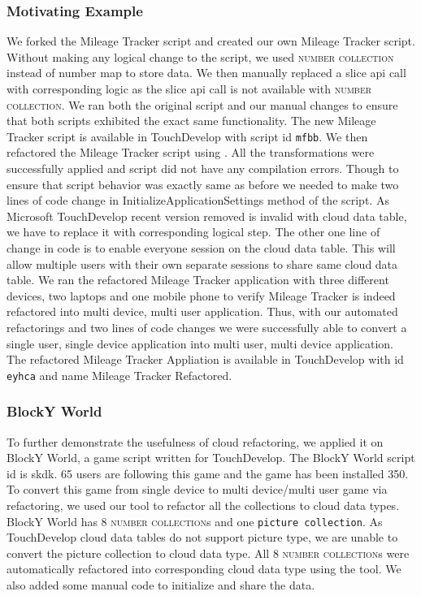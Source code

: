 \documentclass{sigplanconf}
\begin{document}
\subsubsection{Motivating Example}
We forked the Mileage Tracker script and created our own Mileage Tracker script. Without making any logical change to the script, we used \textsc{number collection} instead of number map to store data. We then manually replaced a slice api call with corresponding logic as the slice api call is not available with \textsc{number collection}. We ran both the original script and our manual changes to ensure that both scripts exhibited the exact same functionality. The new Mileage Tracker script is available in TouchDevelop with script id \texttt{mfbb}.  We then refactored the Mileage Tracker script using \tool. All the transformations were successfully applied and script did not have any compilation errors. Though to ensure that script behavior was exactly same as before we needed to make two lines of code change in InitializeApplicationSettings method of the script. As Microsoft TouchDevelop recent version removed is invalid with cloud data table, we have to replace it with corresponding logical step. The other one line of change in code is to enable everyone session on the cloud data table. This will allow multiple users with their own separate sessions to share same cloud data table. We ran the refactored Mileage Tracker application with three different devices, two laptops and one mobile phone to verify Mileage Tracker is indeed refactored into multi device, multi user application. Thus, with our automated refactorings and two lines of code changes we were successfully able to convert a single user, single device application into multi user, multi device application. The refactored Mileage Tracker Appliation is available in TouchDevelop with id \texttt{eyhca} and name Mileage Tracker Refactored. 

\subsubsection{BlockY World}
To further demonstrate the usefulness of cloud refactoring, we applied it on BlockY World, a game script written for TouchDevelop. The BlockY World script id is skdk. 65 users are following this game and the game has been installed 350.  To convert this game from single device to multi device/multi user game via refactoring, we used our tool to refactor all the collections to cloud data types. BlockY World has 8 \textsc{number collection}s and one \texttt{picture collection}. As TouchDevelop cloud data tables do not support picture type, we are unable to convert the picture collection to cloud data type.  All 8 \textsc{number collection}s were automatically refactored into corresponding cloud data type using the tool. We also added some manual code to initialize and share the data. 
\end{document}
